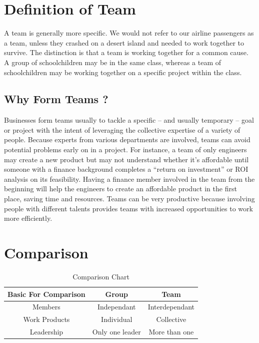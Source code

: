 \documentclass[a4paper,12pt]{report} %
\begin{document}
\section{Definition of Team}
A team is generally more specific.  We would not refer to our airline passengers as a team, unless they crashed on a desert island and needed to work together to survive.  The distinction is that a team is working together for a common cause. A group of schoolchildren may be in the same class, whereas a team of schoolchildren may be working together on a specific project within the class.
\subsection{Why Form Teams ?}
Businesses form teams usually to tackle a specific – and usually temporary – goal or project with the intent of leveraging the collective expertise of a variety of people. Because experts from various departments are involved, teams can avoid potential problems early on in a project. For instance, a team of only engineers may create a new product but may not understand whether it’s affordable until someone with a finance background completes a “return on investment” or ROI analysis on its feasibility. Having a finance member involved in the team from the beginning will help the engineers to create an affordable product in the first place, saving time and resources. Teams can be very productive because involving people with different talents provides teams with increased opportunities to work more efficiently.
\section{Comparison}
\begin{table}[h]
\begin{center}
\begin{tabular}{|c|c|c|}
\hline
Basic For Comparison & Group & Team\\
\hline \hline
Members & Independant & Interdependant\\
\hline
Work Products & Individual & Collective\\ \hline
Leadership & Only one leader & More than one\\
\hline
\end{tabular}
\end{center}
\caption{Comparison Chart}
\label{Comparison Chart}
\end{table}
\end{document}
